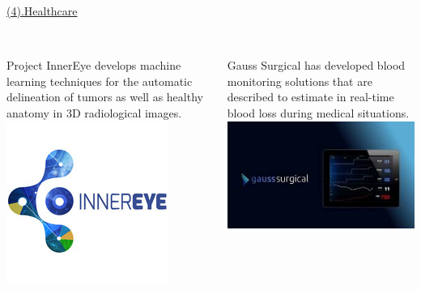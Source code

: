 \documentclass{beamer}
\begin{document}
{{\begin{frame}[t]{\underline{(4).Healthcare}}
\begin{block}
\color{red}{Computer vision has been one of the most remarkable breakthroughs, thanks to machine learning and deep learning, and it’s a particularly active healthcare application.}

\end{block}
\begin{columns}[t]
\pause
\begin{column}{5cm}
\\
\small{Project InnerEye develops machine learning techniques for the automatic delineation of tumors as well as healthy anatomy in 3D radiological images.}\\
		\href{run:Innereye.mp4}{\includegraphics[scale=.4]{innereye.jpg}}
\end{column}
\pause
\begin{column}{5cm}
\\
\small{Gauss Surgical has developed blood monitoring solutions that are described to estimate in real-time blood loss during medical situations.}\\
		\href{run:Gauss.mp4}{\includegraphics[scale=.5]{gauss.jpg}}
\end{column}
\end{columns}
\end{frame}

}

}
\end{document}
